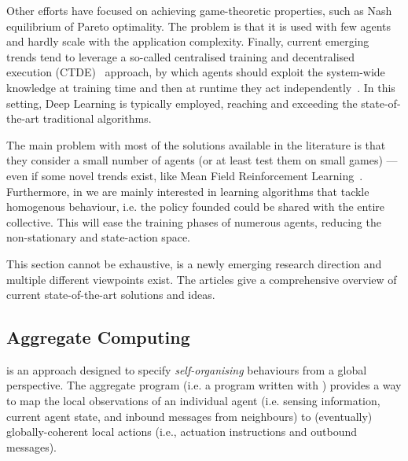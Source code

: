 \documentclass[11pt]{article}
\begin{document}
Other efforts have focused on achieving game-theoretic properties, such as Nash equilibrium of Pareto optimality.
The problem is that it is used with few agents and hardly scale with the application complexity.
%
Finally, current emerging trends tend to leverage a so-called centralised training and decentralised execution (CTDE)~\cite{DBLP:journals/tcyb/NguyenNN20} approach, by which 
 agents should exploit the system-wide knowledge at training time and then at runtime they act independently~\cite{DBLP:journals/aamas/Hernandez-LealK19}. In this setting, Deep Learning is typically employed, reaching and exceeding the state-of-the-art traditional \marl{} algorithms.
 
The main problem with most of the solutions available in the literature is that they consider a small number of agents (or at least test them on small games) --- even if some novel trends exist, like Mean Field Reinforcement Learning~\cite{DBLP:journals/corr/abs-2108-02731}.
Furthermore, in \cpsw{} we are mainly interested in learning algorithms that tackle homogenous behaviour, i.e. the policy founded could be shared with the entire collective. This will ease the training phases of numerous agents, reducing the non-stationary and state-action space.

This section cannot be exhaustive, \marl{} is a newly emerging research direction and multiple different viewpoints exist. The articles \cite{DBLP:journals/aamas/Hernandez-LealK19, DBLP:journals/corr/abs-1911-10635, DBLP:journals/corr/abs-1908-03963} give a comprehensive overview of current state-of-the-art solutions and ideas.
\subsection{Aggregate Computing}

\ac{} is an approach designed to specify \emph{self-organising} behaviours from a global perspective.
%
The aggregate program (i.e. a program written with \ac{}) provides a way to map the local observations of an individual agent (i.e. sensing information, current agent state, and inbound messages from neighbours) to (eventually) globally-coherent local actions
 (i.e., actuation instructions and outbound messages).
%
\end{document}
